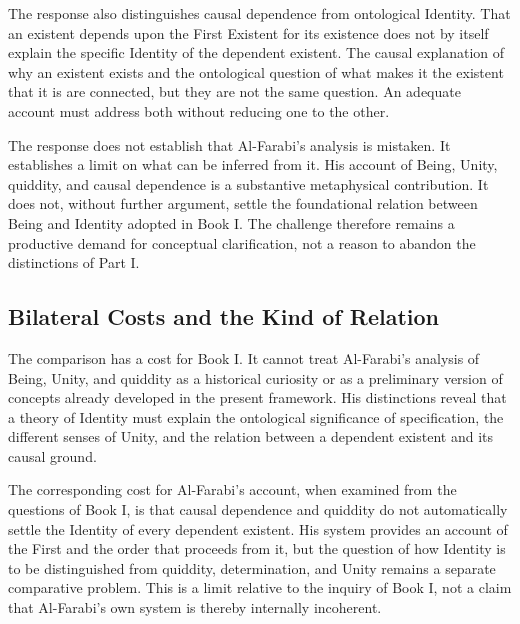 The response also distinguishes
causal dependence from
ontological Identity. That
an existent depends upon
the First Existent for
its existence does not
by itself explain the
specific Identity of the
dependent existent. The
causal explanation of
why an existent exists
and the ontological
question of what makes
it the existent that it
is are connected, but
they are not the same
question. An adequate
account must address
both without reducing
one to the other.

\label{para:VS.B01.P01.C08.S12.SS14.P006}

The response does not establish
that Al-Farabi's analysis
is mistaken. It establishes
a limit on what can be
inferred from it. His
account of Being, Unity,
quiddity, and causal
dependence is a substantive
metaphysical contribution.
It does not, without
further argument, settle
the foundational relation
between Being and Identity
adopted in Book I. The
challenge therefore remains
a productive demand for
conceptual clarification,
not a reason to abandon
the distinctions of Part I.



\subsection{Bilateral Costs and the Kind of Relation}
\label{subsec:ch08-farabi-bilateral-costs}

\label{para:VS.B01.P01.C08.S12.SS15.P001}

The comparison has a cost for
Book I. It cannot treat
Al-Farabi's analysis of
Being, Unity, and quiddity
as a historical curiosity
or as a preliminary version
of concepts already developed
in the present framework.
His distinctions reveal
that a theory of Identity
must explain the ontological
significance of specification,
the different senses of
Unity, and the relation
between a dependent existent
and its causal ground.

\label{para:VS.B01.P01.C08.S12.SS15.P002}

The corresponding cost for
Al-Farabi's account, when
examined from the questions
of Book I, is that causal
dependence and quiddity
do not automatically settle
the Identity of every
dependent existent. His
system provides an account
of the First and the order
that proceeds from it,
but the question of how
Identity is to be distinguished
from quiddity, determination,
and Unity remains a
separate comparative
problem. This is a limit
relative to the inquiry
of Book I, not a claim
that Al-Farabi's own
system is thereby internally
incoherent.

